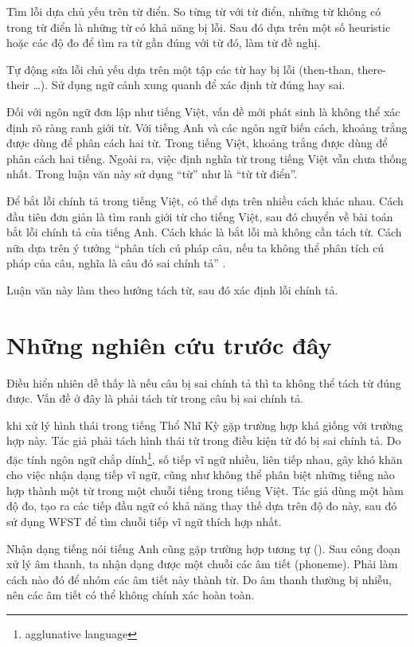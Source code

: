 \documentclass[a4paper,oneside]{book} %
\begin{document}
Tìm lỗi dựa chủ yếu trên từ điển. So từng từ với từ điển, những từ
không có trong từ điển là những từ có khả năng bị lỗi. Sau đó dựa trên
một số heuristic hoặc các độ đo để tìm ra từ gần đúng với từ đó, làm
từ đề nghị.

Tự động sửa lỗi chủ yếu dựa trên một tập các từ hay bị lỗi (then-than,
there-their \ldots). Sử dụng ngữ cảnh xung quanh để xác định từ đúng
hay sai.

Đối với ngôn ngữ đơn lập như tiếng Việt, vấn đề mới phát sinh là không
thể xác định rõ ràng ranh giới từ. Với tiếng Anh và các ngôn ngữ biến
cách, khoảng trắng được dùng để phân cách hai từ. Trong tiếng Việt,
khoảng trắng được dùng để phân cách hai tiếng. Ngoài ra, việc định
nghĩa từ trong tiếng Việt vẫn chưa thống nhất\cite{worddef}. Trong
luận văn này sử dụng ``từ'' như là ``từ từ điển''.

Để bắt lỗi chính tả trong tiếng Việt, có thể dựa trên nhiều cách khác
nhau. Cách đầu tiên đơn giản là tìm ranh giới từ cho tiếng Việt, sau
đó chuyển về bài toán bắt lỗi chính tả của tiếng Anh. Cách khác
là bắt lỗi mà không cần tách từ. \cite{Tuoi}
Cách nữa dựa trên ý tưởng ``phân tích cú pháp câu, nếu ta không thể
phân tích cú pháp của câu, nghĩa là câu đó sai chính tả'' \cite{iccc}.

Luận văn này làm theo hướng tách từ, sau đó xác định lỗi chính tả.

\section{Những nghiên cứu trước đây}

Điều hiển nhiên dễ thấy là nếu câu bị sai chính tả thì ta không thể
tách từ đúng được. Vấn đề ở đây là phải tách từ trong câu bị sai chính
tả.

\cite{Oflazer} khi xử lý hình thái trong tiếng Thổ Nhĩ Kỳ gặp trường
hợp khá giống với trường hợp này. Tác giả phải tách hình thái từ
trong điều kiện từ đó bị sai chính tả. Do đặc tính
ngôn ngữ chắp dính\footnote{agglunative language}, số tiếp vĩ ngữ
nhiều, liên tiếp nhau, gây khó khăn cho việc nhận dạng tiếp vĩ ngữ,
cũng như không thể phân biệt những tiếng nào hợp thành một từ trong
một chuỗi tiếng trong tiếng Việt. Tác giả dùng một hàm độ đo, tạo ra
các tiếp đầu ngữ có khả năng thay thế dựa trên độ đo này, sau đó sử
dụng WFST để tìm chuỗi tiếp vĩ ngữ thích hợp nhất.

Nhận dạng tiếng nói tiếng Anh cũng gặp trường hợp tương tự
(\cite{Ravishankar}). Sau công đoạn xử lý âm thanh, ta nhận dạng được
một chuỗi các âm tiết (phoneme). Phải làm cách nào đó để nhóm các âm
tiết này thành từ. Do âm thanh thường bị nhiễu, nên các âm tiết có thể
không chính xác hoàn toàn.
\end{document}
